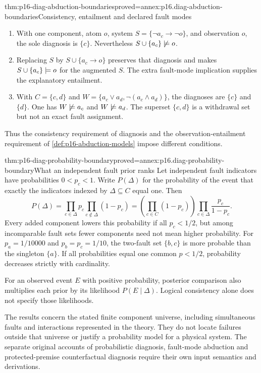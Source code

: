 \begin{hbtheorem}{thm:p16-diag-abduction-boundaries}{proved=annex:p16.diag-abduction-boundaries}{Consistency, entailment and declared fault modes}
\begin{enumerate}
\item With one component, atom \(o\), system
      \(S=\{\neg a_c\to\neg o\}\), and observation \(o\),
      the sole diagnosis is \(\{c\}\). Nevertheless
      \(S\cup\{a_c\}\not\models o\).
\item Replacing \(S\) by \(S\cup\{a_c\to o\}\) preserves
      that diagnosis and makes \(S\cup\{a_c\}\models o\)
      for the augmented \(S\).
      The extra fault-mode implication supplies the
      explanatory entailment.
\item With \(C=\{c,d\}\) and
      \(W=\{a_c\lor a_d,\neg(a_c\land a_d)\}\),
      the diagnoses are \(\{c\}\) and \(\{d\}\).
      One has \(W\not\models a_c\) and \(W\not\models a_d\).
      The superset \(\{c,d\}\) is a withdrawal
      set but not an exact fault assignment.
\end{enumerate}
Thus the consistency requirement of diagnosis and the
observation-entailment requirement of
\cref{def:p16-abduction-models} impose different conditions.
\end{hbtheorem}

\begin{hbtheorem}{thm:p16-diag-probability-boundary}{proved=annex:p16.diag-probability-boundary}{What an independent fault prior ranks}
Let independent fault indicators have probabilities
\(0<p_c<1\). Write \(P(\Delta)\) for the probability of
the event that exactly the indicators indexed by
\(\Delta\subseteq C\) equal one. Then
\[
 P(\Delta)=
   \prod_{c\in\Delta}p_c\prod_{c\notin\Delta}(1-p_c)
   =\left(\prod_{c\in C}(1-p_c)\right)
        \prod_{c\in\Delta}\frac{p_c}{1-p_c}.
\]
Every added component lowers this probability if all
\(p_c<1/2\), but among incomparable fault sets fewer
components need not mean higher probability.
For \(p_a=1/10000\) and \(p_b=p_c=1/10\),
the two-fault set \(\{b,c\}\) is more probable than
the singleton \(\{a\}\).
If all probabilities equal one common \(p<1/2\),
probability decreases strictly with cardinality.

For an observed event \(E\) with positive probability, posterior
comparison also multiplies each prior by its likelihood
\(P(E\mid\Delta)\). Logical consistency alone does not
specify those likelihoods.
\end{hbtheorem}

The results concern the stated finite component universe,
including simultaneous faults and interactions represented in
the theory. They do not locate failures outside that universe
or justify a probability model for a physical system.
The separate original accounts of probabilistic diagnosis,
fault-mode abduction and protected-premise counterfactual
diagnosis require their own input semantics and derivations.

